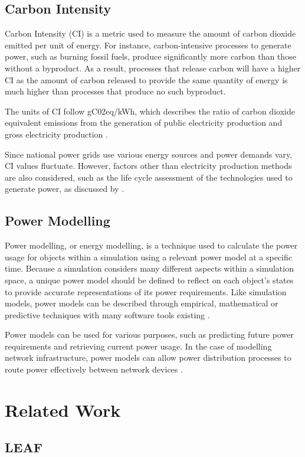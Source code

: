 \documentclass{l4proj}
\begin{document}
\section{Carbon Intensity}

Carbon Intensity (CI) is a metric used to measure the amount of carbon dioxide emitted per unit of energy.
For instance, carbon-intensive processes to generate power, such as burning fossil fuels, produce significantly more carbon than those without a byproduct.
As a result, processes that release carbon will have a higher CI as the amount of carbon released to provide the same quantity of energy is much higher than processes that produce no such byproduct.

The units of CI follow gC02eq/kWh, which describes the ratio of carbon dioxide equivalent emissions from the generation of public electricity production and gross electricity production \citep{EEA_CO2_emission_intensity}.

Since national power grids use various energy sources and power demands vary, CI values fluctuate.
However, factors other than electricity production methods are also considered, such as the life cycle assessment of the technologies used to generate power, as discussed by \cite{PEHNT200655}.

\section{Power Modelling}
Power modelling, or energy modelling, is a technique used to calculate the power usage for objects within a simulation using a relevant power model at a specific time.
Because a simulation considers many different aspects within a simulation space, a unique power model should be defined to reflect on each object's states to provide accurate representations of its power requirements.
Like simulation models, power models can be described through empirical, mathematical or predictive techniques with many software tools existing \citep{IET_Power_System_Modeling}.

Power models can be used for various purposes, such as predicting future power requirements and retrieving current power usage.
In the case of modelling network infrastructure, power models can allow power distribution processes to route power effectively between network devices \citep{etap}.
\chapter{Related Work}
\section{LEAF}\label{leaf}
\end{document}
